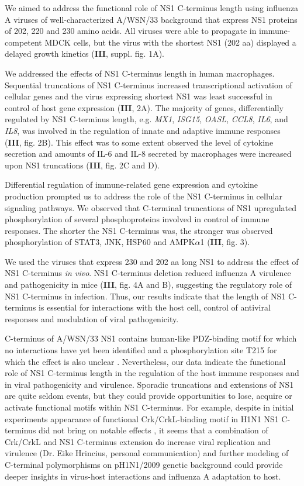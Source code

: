 		We aimed to address the functional role of NS1 C-terminus length using influenza A viruses of well-characterized A/WSN/33 background that express NS1 proteins of 202, 220 and 230 amino acids. All viruses were able to propagate in immune-competent MDCK cells, but the virus with the shortest NS1 (202 \gls{aa}) displayed a delayed growth kinetics (\textbf{III}, suppl. fig. 1A). 
		
		We addressed the effects of NS1 C-terminus length in human macrophages. Sequential truncations of NS1 C-terminus increased transcriptional activation of cellular genes and the virus expressing shortest NS1 was least successful in control of host gene expression (\textbf{III}, 2A). The majority of genes, differentially regulated by NS1 C-terminus length, e.g. \textit{MX1}, \textit{ISG15}, \textit{OASL}, \textit{CCL8}, \textit{IL6}, and \textit{IL8}, was involved in the regulation of innate and adaptive immune responses (\textbf{III}, fig. 2B).  This effect was to some extent observed the level of cytokine secretion and amounts of IL-6 and IL-8 secreted by macrophages were increased upon NS1 truncations (\textbf{III}, fig. 2C and D). 
		
		Differential regulation of immune-related gene expression and cytokine production prompted us to address the role of the NS1 C-terminus in cellular signaling pathways. We observed that C-terminal truncations of NS1 upregulated phosphorylation of several phosphoproteins involved in control of immune responses. The shorter the NS1 C-terminus was, the stronger was observed phosphorylation of STAT3, JNK, HSP60 and AMPK$\alpha$1 (\textbf{III}, fig. 3). 
				
		We used the viruses that express 230 and 202 aa long NS1 to address the effect of NS1 C-terminus \textit{in vivo}. NS1 C-terminus deletion reduced influenza A virulence and pathogenicity in mice (\textbf{III}, fig. 4A and B), suggesting the regulatory role of NS1 C-terminus in infection. Thus, our results indicate that the length of NS1 C-terminus is essential for interactions with the host cell, control of antiviral responses and modulation of viral pathogenicity. 
		
		C-terminus of A/WSN/33 NS1 contains human-like PDZ-binding motif for which no interactions have yet been identified and a phosphorylation site T215 for which the effect is also unclear \parencite{Jackson2010, Hsiang2012}. Nevertheless, our data indicate the functional role of NS1 C-terminus length in the regulation of the host immune responses and in viral pathogenicity and virulence. Sporadic truncations and extensions of NS1 are quite seldom events, but they could provide opportunities to lose, acquire or activate functional motifs within NS1 C-terminus. For example, despite in initial experiments appearance of functional Crk/CrkL-binding motif in H1N1 NS1 C-terminus did not bring on notable effects \parencite{Hale2010e}, it seems that a combination of Crk/CrkL and NS1 C-terminus extension do increase viral replication and virulence (Dr. Eike Hrincius, personal communication) and further modeling of C-terminal polymorphisms on pH1N1/2009 genetic background could provide deeper insights in virus-host interactions and influenza A adaptation to host.
		
